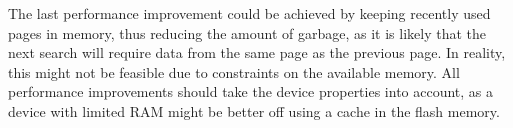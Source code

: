 \documentclass[twocolumn]{phdsymp} %
\begin{document}
The last performance improvement could be achieved by keeping recently used pages in memory, thus reducing the amount of garbage, as it is likely that the next search will require data from the same page as the previous page. In reality, this might not be feasible due to constraints on the available memory. All performance improvements should take the device properties into account, as a device with limited RAM might be better off using a cache in the flash memory.
\nocite{*}



%
\begin{thebibliography}{1}
\end{thebibliography}
%
\end{document}
